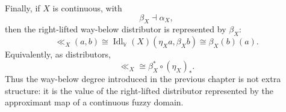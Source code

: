 Finally, if \(X\) is continuous, with
\[
    \beta_X\dashv\alpha_X,
\]
then the right-lifted way-below distributor is represented by \(\beta_X\):
\[
    \ll_X(a,b)
    \cong
    \operatorname{Idl}_{\mathbb V}(X)(\eta_X a,\beta_X b)
    \cong
    \beta_X(b)(a).
\]
Equivalently, as distributors,
\[
    \ll_X
    \cong
    \beta_X^\ast\circ(\eta_X)_\ast.
\]
Thus the way-below degree introduced in the previous chapter is not extra
structure: it is the value of the right-lifted distributor represented by the
approximant map of a continuous fuzzy domain.